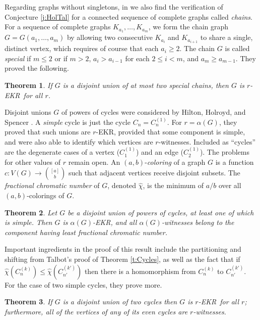 \documentclass{article}
\newtheorem{thm}{Theorem}%
\def\a{{\alpha}}
\def\x{{\chi}}
\def\xh{{\hat{\x}}}
\def\ekr{{\sf EKR}}
\def\rar{{\rightarrow}}
\begin{document}
Regarding graphs without singletons, in \cite{HurlKamaChord} we also find the verification of Conjecture \ref{j:HolTal} for a connected sequence of complete graphs called {\it chains}.
For a sequence of complete graphs $K_{a_1},\ldots,K_{a_m}$, we form the chain graph $G=G(a_1,\ldots,a_m)$ by allowing two consecutive $K_{a_i}$ and $K_{a_{i+1}}$ to share a single, distinct vertex, which requires of course that each $a_i\ge 2$.
The chain $G$ is called {\it special} if $m\le 2$ or if $m>2$, $a_i > a_{i-1}$ for each $2\le i<m$, and $a_m\ge a_{m-1}$.
They proved the following.

\begin{thm}
\label{t:Chains}
If $G$ is a disjoint union of at most two special chains, then $G$ is $r$-\ekr\ for all $r$.
\end{thm}

Disjoint unions $G$ of powers of cycles were considered by Hilton, Holroyd, and Spencer \cite{HilHolSpe}.
A {\it simple} cycle is just the cycle $C_n=C_n^{(1)}$.
For $r=\a(G)$, they proved that such unions are $r$-\ekr, provided that some component is simple, and were also able to identify which vertices are $r$-witnesses.
Included as ``cycles'' are the degenerate cases of a vertex ($C_1^{(1)}$) and an edge ($C_2^{(1)}$).
The problems for other values of $r$ remain open.
An $(a,b)$-{\it coloring} of a graph $G$ is a function 
$c:V(G)\rar\binom{[a]}{b}$ such that adjacent vertices receive disjoint subsets.
The {\it fractional chromatic number} of $G$, denoted $\xh$, is the minimum of $a/b$ over all $(a,b)$-colorings of $G$.

\begin{thm}
\label{t:CyclePowerUnions}
Let $G$ be a disjoint union of powers of cycles, at least one of which is simple.
Then $G$ is $\a(G)$-\ekr, and all $\a(G)$-witnesses belong to the component having least fractional chromatic number.
\end{thm}

Important ingredients in the proof of this result include the partitioning and shifting from Talbot's proof of Theorem \ref{t:Cycles}, as well as the fact that if $\xh(C_n^{(k)})\le \xh(C_{n'}^{(k')})$ then there is a homomorphism from $C_n^{(k)}$ to $C_{n'}^{(k')}$.
For the case of two simple cycles, they prove more.

\begin{thm}
\label{t:2Cycles}
If $G$ is a disjoint union of two cycles then $G$ is $r$-\ekr\ for all $r$; furthermore, all of the vertices
of any of its even cycles are $r$-witnesses.
\end{thm}
\end{document}

